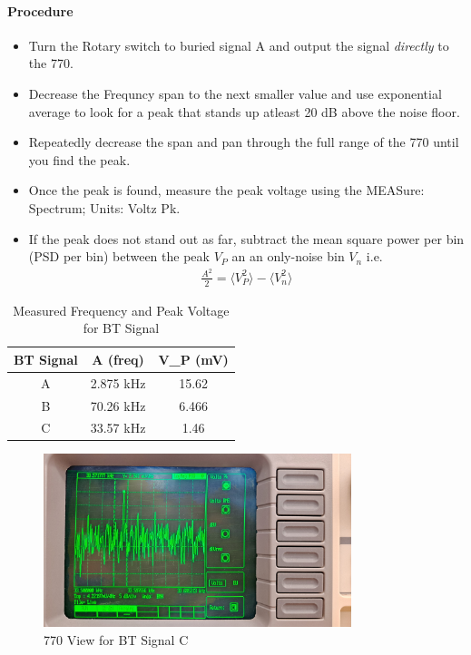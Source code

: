 \documentclass[../main.tex]{subfiles}
\begin{document}
\paragraph*{Procedure}
\begin{itemize}
    \item Turn the Rotary switch to buried signal A and output the signal \textit{directly} to the 770.
    \item Decrease the Frequncy span to the next smaller value and use exponential average to look for a peak that stands up atleast 20 dB above the noise floor.
    \item Repeatedly decrease the span and pan through the full range of the 770 until you find the peak. 
    \item Once the peak is found, measure the peak voltage using the MEASure: Spectrum; Units: Voltz Pk.
    \item If the peak does not stand out as far, subtract the mean square power per bin (PSD per bin) between the peak $V_P$ an an only-noise bin $V_n$ i.e.
    \begin{align*}
        \frac{A^2}{2} = \langle V_P^2 \rangle - \langle V_n^2 \rangle
    \end{align*}
\end{itemize}

\begin{table}[!ht]
    \centering
    \begin{tabular}{|c|c|c|}
    \hline
        BT Signal & A (freq) & V\_P (mV) \\ \hline
        A & 2.875 kHz & 15.62 \\ \hline
        B & 70.26 kHz & 6.466 \\ \hline
        C & 33.57 kHz & 1.46 \\ \hline
    \end{tabular}
    \caption{Measured Frequency and Peak Voltage for BT Signal}
    \label{tab:4}
\end{table}

\begin{figure}[!ht]
    \centering
    \includegraphics[width=0.8\textwidth]{fig1_12.jpg}
    \caption{770 View for BT Signal C}
    \label{fig:1.12}
\end{figure}
\end{document}
